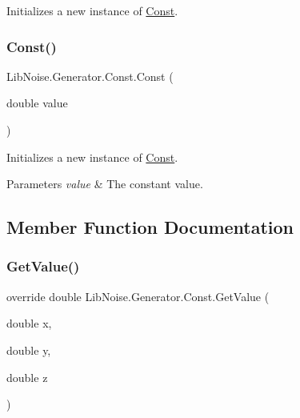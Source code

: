 Initializes a new instance of \hyperlink{class_lib_noise_1_1_generator_1_1_const}{Const}. 

\mbox{\label{class_lib_noise_1_1_generator_1_1_const_af156ba45a9004878c1b8bcf3af5bf4c3}} 
\subsubsection{\texorpdfstring{Const()}{Const()}\hspace{0.1cm}{\footnotesize\ttfamily [2/2]}}
{\footnotesize\ttfamily Lib\+Noise.\+Generator.\+Const.\+Const (\begin{DoxyParamCaption}\item[{double}]{value }\end{DoxyParamCaption})}



Initializes a new instance of \hyperlink{class_lib_noise_1_1_generator_1_1_const}{Const}. 


\begin{DoxyParams}{Parameters}
{\em value} & The constant value.\\
\hline
\end{DoxyParams}


\subsection{Member Function Documentation}
\mbox{\label{class_lib_noise_1_1_generator_1_1_const_a8381b39f997610c7a878cb0f703bcb7e}} 
\subsubsection{\texorpdfstring{Get\+Value()}{GetValue()}}
{\footnotesize\ttfamily override double Lib\+Noise.\+Generator.\+Const.\+Get\+Value (\begin{DoxyParamCaption}\item[{double}]{x,  }\item[{double}]{y,  }\item[{double}]{z }\end{DoxyParamCaption})\hspace{0.3cm}{\ttfamily [virtual]}}



